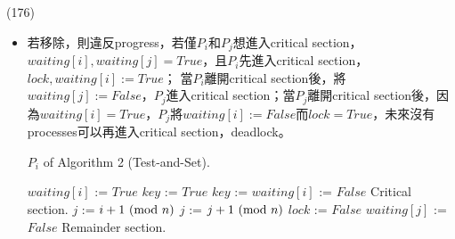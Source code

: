 \begin{theorem}{(176)}
\begin{itemize}
\begin{itemize}
\begin{lstlisting}[caption={Shared variables of Algorithm 2 (\textsc{Test-and-Set}).}, captionpos=b, mathescape=true]
                /*
                True，表示想進但在等；
                False，表示已在critical section或是初值。
                */
                bool waiting[$0 \ \cdots \ (n - 1)$] := $False$
            \end{lstlisting}
            \item 若移除，則違反progress，若僅$P_i$和$P_j$想進入critical section，$waiting[i], waiting[j] = True$，且$P_i$先進入critical section，$lock, waiting[i] := True$；
            當$P_i$離開critical section後，將$waiting[j] := False$，$P_j$進入critical section；當$P_j$離開critical section後，因為$waiting[i] = True$，$P_j$將$waiting[i] := False$而$lock = True$，未來沒有processes可以再進入critical section，deadlock。
            \begin{algorithm}[H]
                \caption{$P_i$ of Algorithm 2 (Test-and-Set).}
                \label{algo:test-and-set-algo-2}
                \begin{algorithmic}[1]
                        \Repeat
                            \State $waiting[i]$ := $True$
                            \State $key$ := $True$ 
                                \State $key$ := 
                            \EndWhile
                            \State $waiting[i]$ := $False$
                            \State Critical section.
                            \State $j$ := $i + 1 \ (\mathrm{mod}\ n)$
                             
                                \State $j$ := $j + 1 \ (\mathrm{mod}\ n)$
                            \EndWhile
                             
                                \State $lock$ := $False$
                            \Else 
                                \State $waiting[j]$ := $False$
                            \EndIf
                            \State Remainder section.
                    \EndFunction
                \end{algorithmic}
            \end{algorithm}
        \end{itemize}
    \end{itemize}
\end{theorem}

